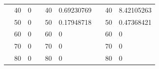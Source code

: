 \begin{table}[h]
\begin{tabular}{|cclcclccl|}
\rowcolor[HTML]{DDFDFF} 
\multicolumn{1}{|c|}{\cellcolor[HTML]{FFFFC7}}                                & \multicolumn{1}{c|}{\cellcolor[HTML]{DDFDFF}40}        & \multicolumn{1}{l|}{\cellcolor[HTML]{DDFDFF}0}          & \multicolumn{1}{c|}{\cellcolor[HTML]{FFFFC7}}                                & \multicolumn{1}{c|}{\cellcolor[HTML]{DDFDFF}40}        & \multicolumn{1}{l|}{\cellcolor[HTML]{DDFDFF}0.69230769} & \multicolumn{1}{c|}{\cellcolor[HTML]{FFFFC7}}                                & \multicolumn{1}{c|}{\cellcolor[HTML]{DDFDFF}40}        & 8.42105263 \\ \cline{2-3} \cline{5-6} \cline{8-9} 
\rowcolor[HTML]{DAE8FC} 
\multicolumn{1}{|c|}{\cellcolor[HTML]{FFFFC7}}                                & \multicolumn{1}{c|}{\cellcolor[HTML]{DAE8FC}50}        & \multicolumn{1}{l|}{\cellcolor[HTML]{DAE8FC}0}          & \multicolumn{1}{c|}{\cellcolor[HTML]{FFFFC7}}                                & \multicolumn{1}{c|}{\cellcolor[HTML]{DAE8FC}50}        & \multicolumn{1}{l|}{\cellcolor[HTML]{DAE8FC}0.17948718} & \multicolumn{1}{c|}{\cellcolor[HTML]{FFFFC7}}                                & \multicolumn{1}{c|}{\cellcolor[HTML]{DAE8FC}50}        & 0.47368421 \\ \cline{2-3} \cline{5-6} \cline{8-9} 
\rowcolor[HTML]{DDFDFF} 
\multicolumn{1}{|c|}{\cellcolor[HTML]{FFFFC7}}                                & \multicolumn{1}{c|}{\cellcolor[HTML]{DDFDFF}60}        & \multicolumn{1}{l|}{\cellcolor[HTML]{DDFDFF}0}          & \multicolumn{1}{c|}{\cellcolor[HTML]{FFFFC7}}                                & \multicolumn{1}{c|}{\cellcolor[HTML]{DDFDFF}60}        & \multicolumn{1}{l|}{\cellcolor[HTML]{DDFDFF}0}          & \multicolumn{1}{c|}{\cellcolor[HTML]{FFFFC7}}                                & \multicolumn{1}{c|}{\cellcolor[HTML]{DDFDFF}60}        & 0          \\ \cline{2-3} \cline{5-6} \cline{8-9} 
\rowcolor[HTML]{DAE8FC} 
\multicolumn{1}{|c|}{\cellcolor[HTML]{FFFFC7}}                                & \multicolumn{1}{c|}{\cellcolor[HTML]{DAE8FC}70}        & \multicolumn{1}{l|}{\cellcolor[HTML]{DAE8FC}0}          & \multicolumn{1}{c|}{\cellcolor[HTML]{FFFFC7}}                                & \multicolumn{1}{c|}{\cellcolor[HTML]{DAE8FC}70}        & \multicolumn{1}{l|}{\cellcolor[HTML]{DAE8FC}0}          & \multicolumn{1}{c|}{\cellcolor[HTML]{FFFFC7}}                                & \multicolumn{1}{c|}{\cellcolor[HTML]{DAE8FC}70}        & 0          \\ \cline{2-3} \cline{5-6} \cline{8-9} 
\rowcolor[HTML]{DDFDFF} 
\multicolumn{1}{|c|}{\cellcolor[HTML]{FFFFC7}}                                & \multicolumn{1}{c|}{\cellcolor[HTML]{DDFDFF}80}        & \multicolumn{1}{l|}{\cellcolor[HTML]{DDFDFF}0}          & \multicolumn{1}{c|}{\cellcolor[HTML]{FFFFC7}}                                & \multicolumn{1}{c|}{\cellcolor[HTML]{DDFDFF}80}        & \multicolumn{1}{l|}{\cellcolor[HTML]{DDFDFF}0}          & \multicolumn{1}{c|}{\cellcolor[HTML]{FFFFC7}}                                & \multicolumn{1}{c|}{\cellcolor[HTML]{DDFDFF}80}        & 0          \\ \cline{2-3} \cline{5-6} \cline{8-9} 

\end{tabular}
\end{table}
